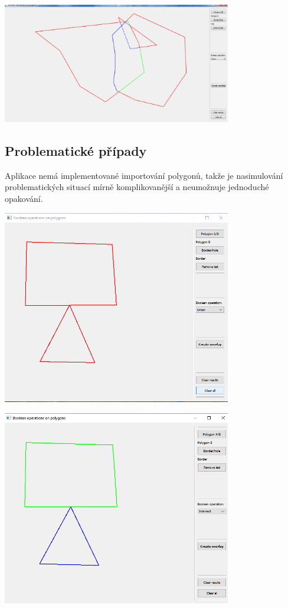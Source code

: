 \documentclass[12pt]{article}
\begin{document}
\begin{center}
   \includegraphics[width=10cm]{./img/aplikacia_diera_Union.png}
\end{center}

\subsection{Problematické případy}
Aplikace nemá implementované importování polygonů, takže je nasimulování problematických situací mírně komplikovanější a neumožnuje jednoduché opakování.

\begin{center}
	\includegraphics[width=10cm]{./img/singular_union.png}
\end{center}

\begin{center}
	\includegraphics[width=10cm]{./img/singular_intersect.png}
\end{center}
\end{document}
